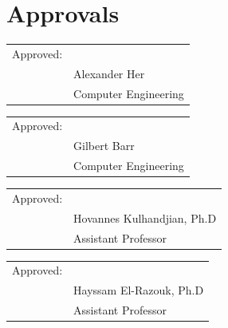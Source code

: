 \documentclass[12pt,onecolumn]{IEEEtran}			%
\begin{document}
 
 \section{Approvals}
\vspace{12pt} 
\vspace{12pt} 



\begin{tabular}{@{}p{.5in}p{4in}@{}}
Approved: & \hrulefill \\
& Alexander Her \\
& Computer Engineering\\
\end{tabular}
\vspace{12pt} 

\begin{tabular}{@{}p{.5in}p{4in}@{}}
Approved: & \hrulefill \\
& Gilbert Barr \\
& Computer Engineering\\
\end{tabular}
\vspace{12pt} 

\begin{tabular}{@{}p{.5in}p{4in}@{}}
Approved: & \hrulefill \\
& Hovannes Kulhandjian, Ph.D \\
& Assistant Professor\\
\end{tabular}
\vspace{12pt} 

\begin{tabular}{@{}p{.5in}p{4in}@{}}
Approved: & \hrulefill \\
& Hayssam El-Razouk, Ph.D \\
& Assistant Professor\\
\end{tabular}


\newpage
~\cite{lu2018survey}
~\cite{mishra2019introduction}
~\cite{shanmugamani2018deep}


 
\end{document}
